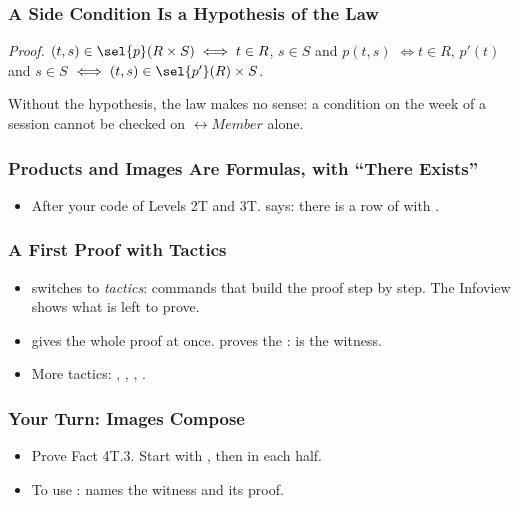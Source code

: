 \documentclass{ltx-talk}
\begin{document}
\begin{frame}
  \frametitle{A Side Condition Is a Hypothesis of the Law}
  \emph{Proof.} $(t, s) \in \sel{p}(R \times S) \iff t \in R$, $s \in S$
  and $p(t, s)$ $\iff t \in R$, $p'(t)$ and $s \in S$ $\iff (t, s) \in
  \sel{p'}(R) \times S$. \proofend
  \par\medskip
  Without the hypothesis, the law makes no sense: a condition on the week
  of a session cannot be checked on $\rel{Member}$ alone.
\end{frame}


\begin{frame*}
  \frametitle{Products and Images Are Formulas, with ``There Exists''}
  \begin{itemize}
    \item After your code of Levels 2T and 3T. 
      says: there is a row  of  with .
  \end{itemize}
\end{frame*}

\begin{frame*}
  \frametitle{A First Proof with Tactics}
  \begin{itemize}
    \item {} switches to \emph{tactics}: commands that build the
      proof step by step. The Infoview shows what is left to prove.
    \item {} gives the whole proof at once. 
      proves the :  is the witness.
    \item More tactics: , , ,
      .
  \end{itemize}
\end{frame*}

\begin{frame*}
  \frametitle{Your Turn: Images Compose}
  \begin{itemize}
    \item {} Prove Fact 4T.3. Start with , then
       in each half.
    \item To use :  names
      the witness and its proof.
  \end{itemize}
\end{frame*}
\end{document}

